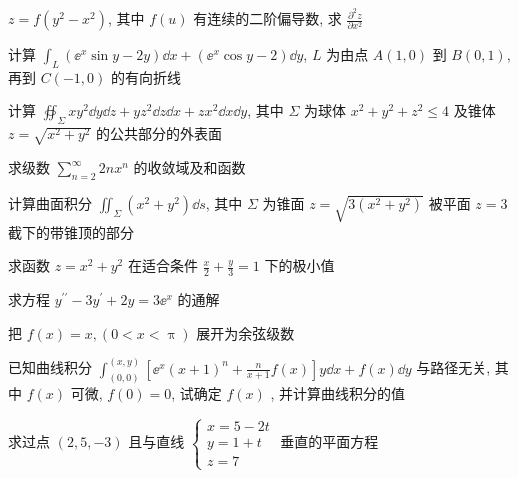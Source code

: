\begin{ti}[$8$ 分]
	$z=f\left(y^{2}-x^{2}\right)$, 其中 $f(u)$ 有连续的二阶偏导数, 求 $\frac{\partial^{2} z}{\partial x^{2}}$
\end{ti}

\begin{ti}[$8$ 分]
	计算 $\int_{L}\left(\ee^{x} \sin y-2 y\right) \dd{x}+\left(\ee^{x} \cos y-2\right) \dd{y}$, $L$ 为由点 $A(1,0)$ 到 $B(0,1)$, 再到 $C(-1,0)$ 的有向折线
\end{ti}

\begin{ti}[$8$ 分]
	计算 $\oiint_{\Sigma} x y^{2} \dd{y} \dd{z}+y z^{2} \dd{z} \dd{x}+z x^{2} \dd{x} \dd{y}$, 其中 $\Sigma$ 为球体 $x^{2}+y^{2}+z^{2} \leqslant 4$ 及锥体 $z=\sqrt{x^{2}+y^{2}}$ 的公共部分的外表面
\end{ti}

\begin{ti}[$8$ 分]
	求级数 $\sum_{n=2}^{\infty} 2 n x^{n}$ 的收敛域及和函数
\end{ti}

\begin{ti}[$8$ 分]
	计算曲面积分 $\iint_{\Sigma}\left(x^{2}+y^{2}\right) \dd{s}$, 其中 $\Sigma$ 为锥面 $z=\sqrt{3\left(x^2+y^2\right)}$ 被平面 $z=3$ 截下的带锥顶的部分
\end{ti}

\begin{ti}[$7$ 分]
	求函数 $z=x^2+y^2$ 在适合条件 $\frac{x}{2}+\frac{y}{3}=1$ 下的极小值
\end{ti}

\begin{ti}[$8$ 分]
	求方程 $y^{\prime \prime}-3 y^{\prime}+2 y=3 \ee^{x}$ 的通解
\end{ti}

\begin{ti}[$7$ 分]
	把 $f(x)=x,(0<x<\uppi)$ 展开为余弦级数
\end{ti}

\begin{ti}[$8$ 分]
	已知曲线积分 $\int_{(0,0)}^{(x, y)}\left[\ee^{x}(x+1)^{n}+\frac{n}{x+1} f(x)\right] y \dd{x}+f(x) \dd{y}$ 与路径无关, 其中 $f(x)$ 可微, $f(0)=0$, 试确定 $f(x)$ , 并计算曲线积分的值
\end{ti}

\begin{ti}[$5$ 分]
	求过点 $(2,5,-3)$ 且与直线 $\begin{cases}
		x=5-2t\\
		y=1+t\\
		z=7
	\end{cases}$ 垂直的平面方程
\end{ti}

